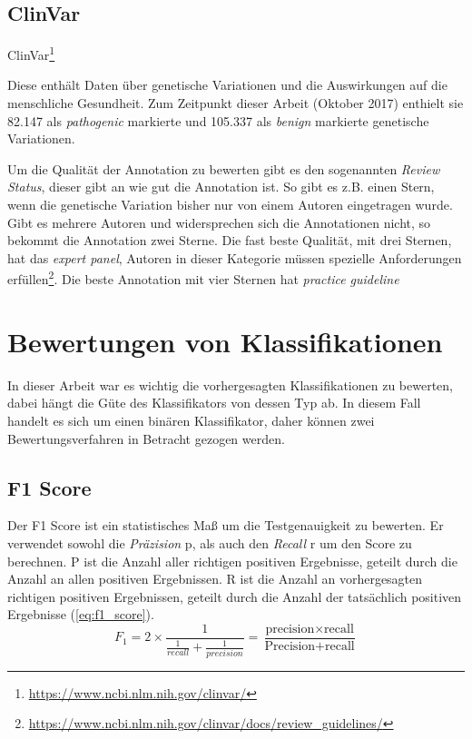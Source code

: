 \subsection{ClinVar}
\label{sec:clinvar}

ClinVar\footnote{\url{https://www.ncbi.nlm.nih.gov/clinvar/}}

Diese enthält Daten über genetische Variationen und die Auswirkungen auf die menschliche Gesundheit. Zum Zeitpunkt dieser Arbeit (Oktober 2017) enthielt sie 82.147 als \emph{pathogenic} markierte und 105.337 als \emph{benign} markierte genetische Variationen.

Um die Qualität der Annotation zu bewerten gibt es den sogenannten \emph{Review Status}, dieser gibt an wie gut die Annotation ist. So gibt es z.B. einen Stern, wenn die genetische Variation bisher nur von einem Autoren eingetragen wurde. Gibt es mehrere Autoren und widersprechen sich die Annotationen nicht, so bekommt die Annotation zwei Sterne. Die fast beste Qualität, mit drei Sternen, hat das \emph{expert panel}, Autoren in dieser Kategorie müssen spezielle Anforderungen erfüllen\footnote{\url{https://www.ncbi.nlm.nih.gov/clinvar/docs/review_guidelines/}}. Die beste Annotation mit vier Sternen hat \emph{practice guideline}


\section{Bewertungen von Klassifikationen}

In dieser Arbeit war es wichtig die vorhergesagten Klassifikationen zu bewerten, dabei hängt die Güte des Klassifikators von dessen Typ ab. In diesem Fall handelt es sich um einen binären Klassifikator, daher können zwei Bewertungsverfahren in Betracht gezogen werden.

\subsection{F1 Score}
Der F1 Score ist ein statistisches Maß um die Testgenauigkeit zu bewerten. Er verwendet sowohl die \emph{Präzision} p, als auch den \emph{Recall} r um den Score zu berechnen. P ist die Anzahl aller richtigen positiven Ergebnisse, geteilt durch die Anzahl an allen positiven Ergebnissen. R ist die Anzahl an vorhergesagten richtigen positiven Ergebnissen, geteilt durch die Anzahl der tatsächlich positiven Ergebnisse (\ref{eq:f1_score}). 
\begin{equation}
    F_{1} = 2 \times \frac{1}{\frac{1}{recall}+\frac{1}{precision}} = \frac{\text{precision} \times \text{recall}}{\text{Precision} + \text{recall}}
    \label{eq:f1_score}
\end{equation}

